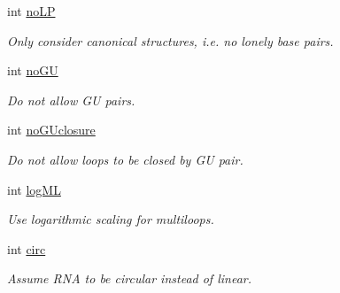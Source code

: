 \begin{DoxyCompactItemize}
\mbox{\label{group__model__details_a753200bf21cee0ea2df64afe43999f5d}} 
int \mbox{\hyperlink{group__model__details_a753200bf21cee0ea2df64afe43999f5d}{no\+LP}}
\begin{DoxyCompactList}\small\item\em Only consider canonical structures, i.\+e. no \textquotesingle{}lonely\textquotesingle{} base pairs. \end{DoxyCompactList}\item 
\mbox{\label{group__model__details_ad64a5eaf9c4550e7525b36a725fec4b2}} 
int \mbox{\hyperlink{group__model__details_ad64a5eaf9c4550e7525b36a725fec4b2}{no\+GU}}
\begin{DoxyCompactList}\small\item\em Do not allow GU pairs. \end{DoxyCompactList}\item 
\mbox{\label{group__model__details_a7e883db1f33f8f3baa5c9b140350c78e}} 
int \mbox{\hyperlink{group__model__details_a7e883db1f33f8f3baa5c9b140350c78e}{no\+G\+Uclosure}}
\begin{DoxyCompactList}\small\item\em Do not allow loops to be closed by GU pair. \end{DoxyCompactList}\item 
\mbox{\label{group__model__details_ae259f89a94acae0c7f1412603e7f57b5}} 
int \mbox{\hyperlink{group__model__details_ae259f89a94acae0c7f1412603e7f57b5}{log\+ML}}
\begin{DoxyCompactList}\small\item\em Use logarithmic scaling for multiloops. \end{DoxyCompactList}\item 
\mbox{\label{group__model__details_a92762e1008503d4623ff5c01e358a464}} 
int \mbox{\hyperlink{group__model__details_a92762e1008503d4623ff5c01e358a464}{circ}}
\begin{DoxyCompactList}\small\item\em Assume R\+NA to be circular instead of linear. \end{DoxyCompactList}\item 
\mbox{\label{group__model__details_af88a511a2b1f526b4c6213de6cb8fd6e}} 

\end{DoxyCompactItemize}
